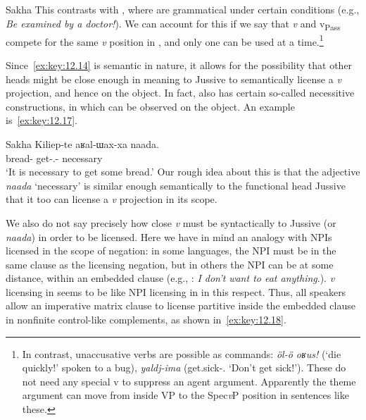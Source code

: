 \documentclass[output=paper]{langsci/langscibook}
\begin{document}
\ea\label{ex:key:12.16}Sakha
\z
This contrasts with , where   are grammatical
under certain conditions (e.g., \emph{Be examined by a doctor!}). We can
account for this if we say that \emph{v}\textsubscript{\Imp} and
v\textsubscript{Pass} compete for the same \emph{v} position in ,
and only one can be used at a time.\footnote{In contrast,
    unaccusative verbs are possible as commands: \emph{öl-ö
    oʁus!} (‘die quickly!’ spoken to a bug), \emph{yaldj-ima}
    (get.sick-\Neg.\Imp{} ‘Don’t get sick!’). These do not need any special v
to suppress an agent argument. Apparently the theme argument can move from
inside VP to the Spec\emph{v}\textsubscript{\Imp}P position in sentences like
these.}

Since~\eqref{ex:key:12.14} is semantic in nature, it allows for the possibility
that other heads might be close enough in meaning to Jussive to semantically
license a \emph{v}\textsubscript{\Imp} projection, and hence  on the object. In fact,  also has certain so-called
necessitive constructions, in which  can be observed on the
object. An example is~\eqref{ex:key:12.17}.

\ea\label{ex:key:12.17}Sakha
    \sn
    \gll Kiliep-te  aʁal-ɯax-xa  naada.\\
    bread-\Part{}  get-\Pros{}.\Ptcp{}-\Dat{}  necessary\\
    \glt ‘It is necessary to get some bread.’ \parencite[429]{StachowskiMenz1998}
\z
Our rough idea about this is that the adjective \emph{naada} ‘necessary’ is
similar enough semantically to the functional head Jussive that it too can
license a \emph{v}\textsubscript{\Imp} projection in its scope.

We also do not say precisely how close \emph{v}\textsubscript{\Imp} must be
syntactically to Jussive (or \emph{naada}) in order to be licensed. Here we
have in mind an analogy with \glspl{NPI} licensed in the scope of negation: in
some languages, the \gls{NPI} must be in the same clause as the licensing
negation, but in others the \gls{NPI} can be at some distance, within an
embedded clause (e.g., : \emph{I don’t} \emph{want to eat
anything}.).  \emph{v}\textsubscript{\Imp} licensing in  seems to be
like NPI licensing in  in this respect. Thus, all speakers allow
an imperative matrix clause to license partitive inside the embedded clause in
nonfinite control-like complements, as shown in~\eqref{ex:key:12.18}.\newpage
\end{document}
